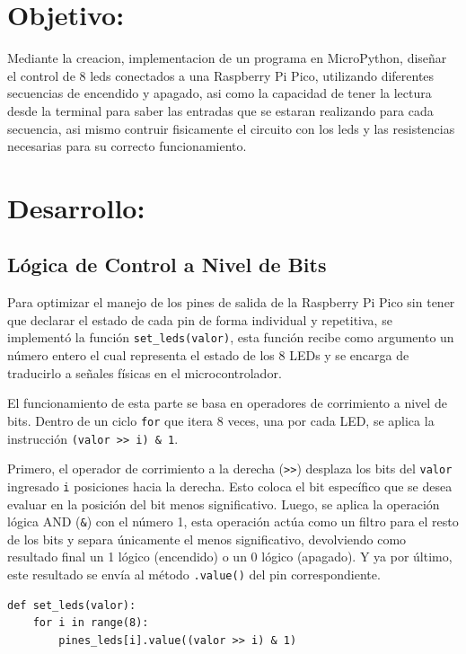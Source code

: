 \documentclass[letterpaper,12pt]{article}
\begin{document}
    

    \newpage
    \setcounter{page}{1}

    \section{Objetivo:}

    Mediante la creacion, implementacion de un programa en MicroPython, diseñar el control de 8 leds conectados a una Raspberry Pi Pico, utilizando diferentes secuencias de encendido y apagado, asi como la capacidad de tener la lectura desde la terminal para saber las entradas
    que se estaran realizando para cada secuencia, asi mismo contruir fisicamente el circuito con los leds y las resistencias necesarias para su correcto funcionamiento.
    \section{Desarrollo:}
    
    \subsection{Lógica de Control a Nivel de Bits}
    Para optimizar el manejo de los pines de salida de la Raspberry Pi Pico sin tener que declarar el estado de cada pin de forma individual y repetitiva, se implementó la función \texttt{set\_leds(valor)}, esta función recibe como argumento un número entero el cual representa el estado de los 8 LEDs y se encarga de traducirlo a señales físicas en el microcontrolador.
    
    El funcionamiento de esta parte se basa en operadores de corrimiento a nivel de bits. Dentro de un ciclo \texttt{for} que itera 8 veces, una por cada LED, se aplica la instrucción \texttt{(valor >> i) \& 1}. 
    
    Primero, el operador de corrimiento a la derecha (\texttt{>>}) desplaza los bits del \texttt{valor} ingresado \texttt{i} posiciones hacia la derecha. Esto coloca el bit específico que se desea evaluar en la posición del bit menos significativo. Luego, se aplica la operación lógica AND (\texttt{\&}) con el número 1, esta operación actúa como un filtro para el resto de los bits y separa únicamente el menos significativo, devolviendo como resultado final un 1 lógico (encendido) o un 0 lógico (apagado). Y ya por último, este resultado se envía al método \texttt{.value()} del pin correspondiente.

    \begin{lstlisting}[language={[LAB]Python}, caption={Función para manejar el estado de los pines mediante lógica a nivel de bits}]
def set_leds(valor):
    for i in range(8):
        pines_leds[i].value((valor >> i) & 1)
    \end{lstlisting}
\end{document}
